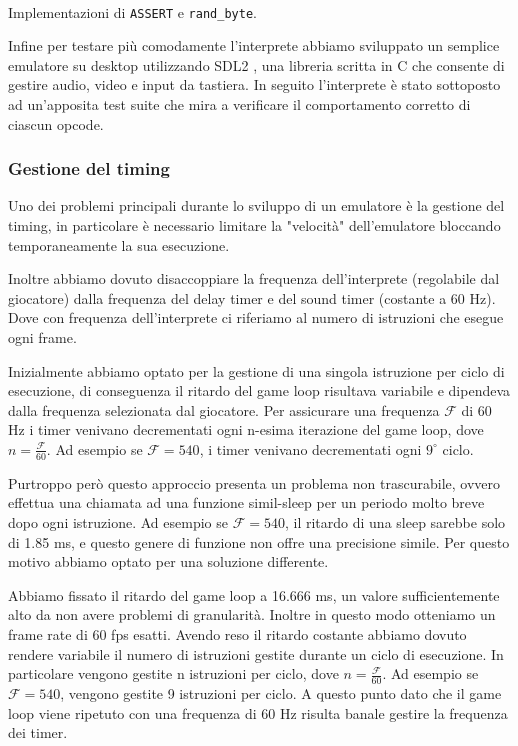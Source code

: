 \documentclass[a4paper]{article}
\begin{document}
\clearpage

\begin{Listing}[h!t]
    \centering
    \mbox{
        \quad
    }
    \caption{Implementazioni di \texttt{ASSERT} e \texttt{rand\_byte}.}
    \label{assert_rand}
\end{Listing}

Infine per testare più comodamente l'interprete abbiamo sviluppato
un semplice emulatore su desktop utilizzando SDL2
\cite{libsdl:about}, una libreria scritta in C che consente di
gestire audio, video e input da tastiera.
In seguito l'interprete è stato sottoposto ad un'apposita
test suite \cite{github:chip8-test-suite} che mira a verificare
il comportamento corretto di ciascun opcode.

\subsubsection{Gestione del timing}

Uno dei problemi principali durante lo sviluppo di un emulatore è
la gestione del timing, in particolare è necessario limitare la
"velocità" dell'emulatore bloccando temporaneamente la sua
esecuzione.

Inoltre abbiamo dovuto disaccoppiare la frequenza dell'interprete
(regolabile dal giocatore) dalla frequenza del delay timer e del
sound timer (costante a 60 Hz). Dove con frequenza dell'interprete
ci riferiamo al numero di istruzioni che esegue ogni frame.

Inizialmente abbiamo optato per la gestione di una singola istruzione per ciclo di esecuzione,
di conseguenza il ritardo del game loop risultava variabile e dipendeva dalla frequenza selezionata
dal giocatore. Per assicurare una frequenza $\mathcal{F}$ di 60 Hz i timer venivano decrementati
ogni n-esima iterazione del game loop, dove $n = \frac{\mathcal{F}}{60}$. Ad esempio se
$\mathcal{F} = 540$, i timer venivano decrementati ogni $9^{\circ}$ ciclo.

Purtroppo però questo approccio presenta un problema non trascurabile, ovvero effettua una chiamata
ad una funzione simil-sleep per un periodo molto breve dopo ogni istruzione. Ad esempio se
$\mathcal{F} = 540$, il ritardo di una sleep sarebbe solo di 1.85 ms, e questo genere di funzione
non offre una precisione simile. Per questo motivo abbiamo optato per una soluzione differente.

Abbiamo fissato il ritardo del game loop a 16.666 ms, un valore sufficientemente alto da non avere
problemi di granularità. Inoltre in questo modo otteniamo un frame rate di 60 fps esatti.
Avendo reso il ritardo costante abbiamo dovuto rendere variabile il numero di istruzioni gestite
durante un ciclo di esecuzione. In particolare vengono gestite n istruzioni per ciclo,
dove $n = \frac{\mathcal{F}}{60}$. Ad esempio se $\mathcal{F} = 540$, vengono gestite 9 istruzioni
per ciclo. A questo punto dato che il game loop viene ripetuto con una frequenza di 60 Hz risulta
banale gestire la frequenza dei timer.
\end{document}
